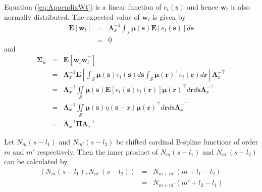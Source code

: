 \documentclass[draftcls,onecolumn]{IEEEtran}
\begin{document}
{{{\begin{lemma}
\label{lemma:FieldCovariance}
\end{lemma}
\begin{IEEEproof}
 Equation (\ref{eq:AppendixWt}) is a linear function of $e_t(\mathbf s)$ and hence $\mathbf{w}_t$ is also normally distributed. The expected value of $\mathbf w_t$ is given by 
\begin{eqnarray}
 \mathbf E\left[ \mathbf w_t\right]&=& \mathbf{\Lambda}_{x}^{-1}\int_{\mathcal{S}}\boldsymbol\mu \left(\mathbf{s}\right)\mathbf E\left[e_t\left(\mathbf{s}\right)\right] d\mathbf{s} \nonumber \\
&=&0
\end{eqnarray}
and 
\begin{eqnarray}
\mathbf \Sigma_w&{}={}&\mathbf E[ \mathbf w_t \mathbf w_{t}^{\top}]\nonumber\\
&=& \mathbf{\Lambda}_{x}^{-1}\mathbf E[\int_{\mathcal{S}}\boldsymbol\mu\left(\mathbf s\right)e_t\left(\mathbf s\right)d\mathbf s\int_{\mathcal{S}}\boldsymbol\mu\left(\mathbf r\right)^{\top}e_t\left(\mathbf r\right)d\mathbf r]\mathbf{\Lambda}_{x}^{- \top} \nonumber \\
&=&\mathbf{\Lambda}_{x}^{-1}\iint\limits_{\mathcal{S}}\boldsymbol\mu\left(\mathbf s\right) \mathbf E[e_t\left(\mathbf s\right)e_t\left(\mathbf r\right)]\boldsymbol\mu\left(\mathbf r\right)^{\top}d\mathbf r d\mathbf s\mathbf{\Lambda}_{x}^{- \top} \nonumber\\
&=&{}\mathbf{\Lambda}_{x}^{-1}\iint\limits_{\mathcal{S}}\boldsymbol\mu\left(\mathbf s\right) \eta\left(\mathbf s- \mathbf r \right)\boldsymbol\mu\left(\mathbf r\right)^{\top}d\mathbf r d\mathbf s\mathbf{\Lambda}_{x}^{- \top} \nonumber\\
&=&\mathbf{\Lambda}_{x}^{-1}\boldsymbol\Pi\mathbf{\Lambda}_{x}^{- \top}
\end{eqnarray}
\setlength{\arraycolsep}{5pt}
\end{IEEEproof}
\begin{lemma}
Let $N_m\left(s-l_1\right)$ and $N_{m'}\left(s-l_2\right)$ be shifted cardinal B-spline functions of order $m$ and $m'$ respectively. Then the inner product of  $N_m\left(s-l_1\right)$  and $N_{m'}\left(s-l_2\right)$ can be calculated by 
\setlength{\arraycolsep}{0.0em}
\begin{eqnarray}
\left\langle N_{m}\left(s-l_{1}\right), N_{m'}\left(s-l_{2}\right)\right\rangle&=&N_{m+m'}\left(m+l_{1}-l_{2}\right) \nonumber \\
&=&N_{m+m'}\left(m'+l_{2}-l_{1}\right) 
\end{eqnarray}
\setlength{\arraycolsep}{5pt}

\end{lemma}}}}
\end{document}
